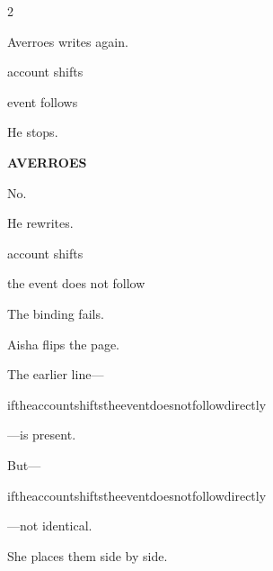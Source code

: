 \begin{paracol}{2}

\medskip

\switchcolumn

Averroes writes again.

\medskip

 account shifts

\medskip

 event follows

\medskip

He stops.

\medskip

\textbf{AVERROES}

No.

\medskip

He rewrites.

\medskip

 account shifts

\medskip

the event does not follow

\medskip

The binding fails.

\medskip

\switchcolumn*


\medskip

\switchcolumn

Aisha flips the page.

\medskip

The earlier line---

\medskip

{\Clypto iftheaccountshiftstheeventdoesnotfollowdirectly}

\medskip

---is present.

\medskip

But---

\medskip

{\Clypto iftheaccountshiftstheeventdoesnotfollowdirectly}

\medskip

---not identical.

\medskip

She places them side by side.


\end{paracol}

